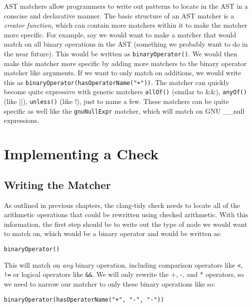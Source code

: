 AST matchers allow programmers to write out patterns to locate in the AST in a conscise and declarative manner. The basic structure of an AST matcher is a \textit{creator function}, which can contain more matchers within it to make the matcher more specific. For example, say we would want to make a matcher that would match on all binary operations in the AST (something we probably want to do in the near future). This would be written as \texttt{binaryOperator()}. We would then make this matcher more specific by adding more matchers to the binary operator matcher like arguments. If we want to only match on additions, we would write this as \texttt{binaryOperator(hasOperatorName("+"))}. The matcher can quickly become quite expressive with generic matchers \texttt{allOf()} (similar to \&\&), \texttt{anyOf()} (like ||), \texttt{unless()} (like !), just to name a few. These matchers can be quite specific as well like the \texttt{gnuNullExpr} matcher, which will match on GNU \_\_null expressions.

\section{Implementing a Check}

\subsection{Writing the Matcher}

As outlined in previous chapters, the clang-tidy check needs to locate all of the arithmetic operations that could be rewritten using checked arithmetic. With this information, the first step should be to write out the type of node we would want to match on, which would be a binary operator and would be written as:
\begin{center}
\texttt{binaryOperator()}
\end{center}

This will match on \textit{any} binary operation, including comparison operators like \texttt{<}, \texttt{!=} or logical operators like \texttt{\&\&}. We will only rewrite the +, -, and * operators, so we need to narrow our matcher to only these binary operations like so:
\begin{center}
\texttt{binaryOperator(hasOperatorName("+", "-", "-"))}
\end{center}

